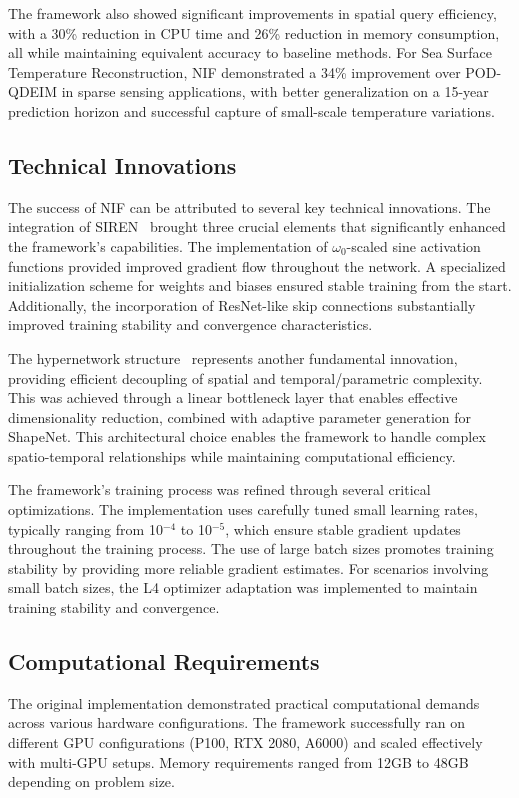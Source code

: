 \documentclass[10pt,journal,compsoc,onecolumn]{IEEEtran}
\begin{document}
The framework also showed significant improvements in spatial query efficiency, with a 30\% reduction in CPU time and 26\% reduction in memory consumption, all while maintaining equivalent accuracy to baseline methods. For Sea Surface Temperature Reconstruction, NIF demonstrated a 34\% improvement over POD-QDEIM in sparse sensing applications, with better generalization on a 15-year prediction horizon and successful capture of small-scale temperature variations.

\subsection{Technical Innovations}
The success of NIF can be attributed to several key technical innovations. The integration of SIREN~\cite{siren2020} brought three crucial elements that significantly enhanced the framework's capabilities. The implementation of $\omega_0$-scaled sine activation functions provided improved gradient flow throughout the network. A specialized initialization scheme for weights and biases ensured stable training from the start. Additionally, the incorporation of ResNet-like skip connections substantially improved training stability and convergence
characteristics.

The hypernetwork structure~\cite{hypernetworks2016} represents another fundamental innovation, providing efficient decoupling of spatial and temporal/parametric complexity. This was achieved through a linear bottleneck layer that enables effective dimensionality reduction, combined with adaptive parameter generation for ShapeNet. This architectural choice enables the framework to handle complex spatio-temporal relationships while maintaining computational efficiency.

The framework's training process was refined through several critical optimizations. The implementation uses carefully tuned small learning rates, typically ranging from 10$^{-4}$ to 10$^{-5}$, which ensure stable gradient updates throughout the training process. The use of large batch sizes promotes training stability by providing more reliable gradient estimates. For scenarios involving small batch sizes, the L4 optimizer adaptation was implemented to maintain training stability and convergence.

\subsection{Computational Requirements}
The original implementation demonstrated practical computational demands across various hardware configurations. The framework successfully ran on different GPU configurations (P100, RTX 2080, A6000) and scaled effectively with multi-GPU setups. Memory requirements ranged from 12GB to 48GB depending on problem size.
\end{document}
